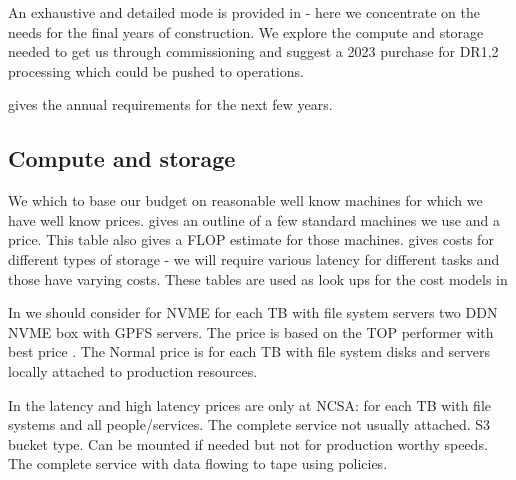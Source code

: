 An exhaustive and detailed mode is provided in   - here we concentrate on the needs for the
final years of construction. We explore the compute and storage needed to get us through commissioning and suggest a 2023 purchase for DR1,2 processing which could be pushed to operations.

 gives the annual requirements for the next few years.



\subsection{Compute and storage }\label{sec:csmodel}
We which to base our budget on reasonable well know machines for which we have well know prices.
 gives an outline of a few standard machines we use and a price. This table also gives a FLOP estimate
for those machines.
 gives costs for different types of storage - we will require various latency for different tasks
and those have varying costs.
These tables are used as look ups for the cost models in 



In  we should consider for NVME for each TB with file system servers two DDN NVME box with GPFS servers.
The price is based on the TOP performer with best price .
The Normal price is for each TB with file system disks and servers locally attached to production resources.

In the latency and high latency prices are only at NCSA: for each TB with file systems and all people/services.
The complete service not usually attached.   S3 bucket type.
Can be mounted if needed but not for production worthy speeds.
The complete service with data flowing to tape using policies.





